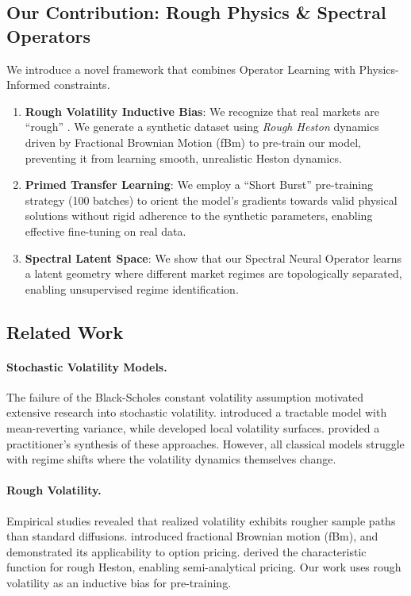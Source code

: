 \documentclass{article}
\begin{document}
\subsection{Our Contribution: Rough Physics \& Spectral Operators}
We introduce a novel framework that combines Operator Learning with Physics-Informed constraints.
\begin{enumerate}
    \item \textbf{Rough Volatility Inductive Bias}: We recognize that real markets are ``rough'' \citep{rosenbaum2018rough}. We generate a synthetic dataset using \emph{Rough Heston} dynamics driven by Fractional Brownian Motion (fBm) to pre-train our model, preventing it from learning smooth, unrealistic Heston dynamics.
    \item \textbf{Primed Transfer Learning}: We employ a ``Short Burst'' pre-training strategy (100 batches) to orient the model's gradients towards valid physical solutions without rigid adherence to the synthetic parameters, enabling effective fine-tuning on real data.
    \item \textbf{Spectral Latent Space}: We show that our Spectral Neural Operator learns a latent geometry where different market regimes are topologically separated, enabling unsupervised regime identification.
\end{enumerate}

\subsection{Related Work}

\paragraph{Stochastic Volatility Models.}
The failure of the Black-Scholes constant volatility assumption \citep{black1973pricing} motivated extensive research into stochastic volatility. \citet{heston1993} introduced a tractable model with mean-reverting variance, while \citet{dupire1994pricing} developed local volatility surfaces. \citet{gatheral2006volatility} provided a practitioner's synthesis of these approaches. However, all classical models struggle with regime shifts where the volatility dynamics themselves change.

\paragraph{Rough Volatility.}
Empirical studies revealed that realized volatility exhibits rougher sample paths than standard diffusions. \citet{mandelbrot1968fractional} introduced fractional Brownian motion (fBm), and \citet{bayer2016pricing} demonstrated its applicability to option pricing. \citet{rosenbaum2018rough} derived the characteristic function for rough Heston, enabling semi-analytical pricing. Our work uses rough volatility as an inductive bias for pre-training.
\end{document}
